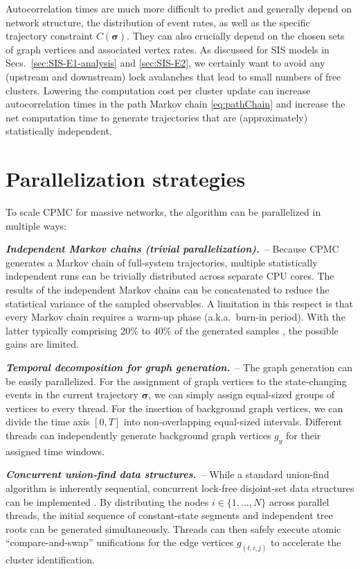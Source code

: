 \documentclass[english,10pt,aps,pra,twocolumn,superscriptaddress,floatfix,fleqn]{revtex4-2}
\renewcommand{\vec}[1]{{\boldsymbol{#1}}}
\newcommand{\vs}{\vec{\sigma}}
\newcommand{\Emph}[1]{\emph{\textbf{#1}}}
\begin{document}
Autocorrelation times are much more difficult to predict and generally depend on network structure, the distribution of event rates, as well as the specific trajectory constraint $C(\vs)$. They can also crucially depend on the chosen sets of graph vertices and associated vertex rates. As discussed  for SIS models in Secs.~\ref{sec:SIS-E1-analysis} and \ref{sec:SIS-E2}, we certainly want to avoid any (upstream and downstream) lock avalanches that lead to small numbers of free clusters. Lowering the computation cost per cluster update can increase autocorrelation times in the path Markov chain \eqref{eq:pathChain} and increase the net computation time to generate trajectories that are (approximately) statistically independent. 

\section{Parallelization strategies}\label{sec:parallel}
To scale CPMC for massive networks, the algorithm can be parallelized in multiple ways:

\Emph{Independent Markov chains (trivial parallelization).}~--
Because CPMC generates a Markov chain of full-system trajectories, multiple statistically independent runs can be trivially distributed across separate CPU cores. The results of the independent Markov chains can be concatenated to reduce the statistical variance of the sampled observables. A limitation in this respect is that every Markov chain requires a warm-up phase (a.k.a.\ burn-in period). With the latter typically comprising 20\% to 40\% of the generated samples \cite{Gelman2013}, the possible gains are limited.

\Emph{Temporal decomposition for graph generation.}~--
The graph generation can be easily parallelized. For the assignment of graph vertices to the state-changing events in the current trajectory $\vs$, we can simply assign equal-sized groups of vertices to every thread. For the insertion of background graph vertices, we can divide the time axis  $[0,T]$ into non-overlapping equal-sized intervals. Different threads can independently generate background graph vertices $g_y$ for their assigned time windows.

\Emph{Concurrent union-find data structures.}~--
While a standard union-find algorithm is inherently sequential, concurrent lock-free disjoint-set data structures can be implemented \cite{Anderson1991-23,Alistarh2019-153,Jayanti2021-34}. By distributing the nodes $i\in\{1,\dotsc,N\}$ across parallel threads, the initial sequence of constant-state segments and independent tree roots can be generated simultaneously. Threads can then safely execute atomic ``compare-and-swap'' unifications for the edge vertices $g_{(t,i,j)}$ to accelerate the cluster identification.
\end{document}
